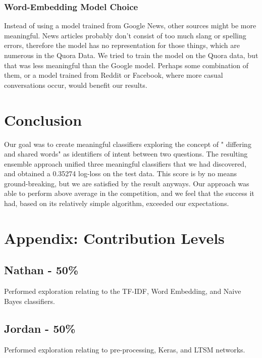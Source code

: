 \documentclass{article}
\begin{document}
\subsubsection{Word-Embedding Model Choice}

Instead of using a model trained from Google News, other sources might be more
meaningful. News articles probably don’t consist of too much slang or spelling
errors, therefore the model has no representation for those things, which are
numerous in the Quora Data. We tried to train the model on the Quora data, but
that was less meaningful than the Google model. Perhaps some combination of
them, or a model trained from Reddit or Facebook, where more casual
conversations occur, would benefit our results.

\section{Conclusion} \label{headings} Our goal was to create meaningful
classifiers exploring the concept of " differing and shared words" as
identifiers of intent between two questions. The resulting ensemble approach
unified three meaningful classifiers that we had discovered, and obtained a
0.35274 log-loss on the test data. This score is by no means ground-breaking,
but we are satisfied by the result anyways. Our approach was able to perform
above average in the competition, and we feel that the success it had, based on
its relatively simple algorithm, exceeded our expectations.

\section*{Appendix: Contribution Levels}

\subsection*{Nathan - 50\%}
Performed exploration relating to the TF-IDF, Word Embedding, and Naive Bayes classifiers.

\subsection*{Jordan - 50\%}
Performed exploration relating to pre-processing, Keras, and LTSM networks.
\end{document}
